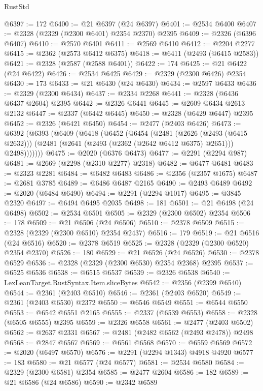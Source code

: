 \begin{lexlean}{RustStd}
\begin{coremodule}
{\begin{coremodule}
{{{{{{{{{{{{{{{{{{{{{{{{{{{{{{{{{{{{{@6397 := 172
@6400 := @21 @6397 (@24 @6397)
@6401 := @2534 @6400
@6407 := @2328 (@2329 (@2300 @6401) @2354 @2370) @2395
@6409 := @2326 (@6396 @6407)
@6410 := @2570 @6401
@6411 := @2569 @6410
@6412 := @2204 @2277
@6415 := @2362 (@2573 @6412 @6375)
@6418 := @6411 (@2493 (@6415 @2583))
@6421 := @2328 (@2587 (@2588 @6401))
@6422 := 174
@6425 := @21 @6422 (@24 @6422)
@6426 := @2534 @6425
@6429 := @2329 (@2300 @6426) @2354
@6430 := 173
@6433 := @21 @6430 (@24 @6430)
@6434 := @2597 @6433
@6436 := @2329 (@2300 @6434)
@6437 := @2334 @2268
@6441 := @2328 (@6436 @6437 @2604) @2395
@6442 := @2326 @6441
@6445 := @2609 @6434 @2613 @2132
@6447 := @2337 (@6442 @6445)
@6450 := @2328 (@6429 @6447) @2395
@6452 := @2326 (@6421 @6450)
@6454 := @2477 (@2403 @6426)
@6473 := @6392
    (@6393
      (@6409
        (@6418
          (@6452
            (@6454
              (@2481
                (@2626 (@2493 (@6415 @2632)))
                (@2481 (@2641 (@2493 (@2362 (@2642 @6412 @6375) @2651))) @2498)))))))
@6475 := @2020 (@6376 @6473)
@6477 := @2291 (@2294 @987)
@6481 := @2669 (@2298 (@2310 @2277) @2318)
@6482 := @6477 @6481
@6483 := @2323 @2281
@6484 := @6482 @6483
@6486 := @2356 (@2357 @1675)
@6487 := @2681 @3785
@6489 := @6486 @6487 @2165
@6490 := @2493 @6489
@6492 := @2020 (@6484 @6490)
@6494 := @2291 (@2294 @1017)
@6495 := @3845 @2320
@6497 := @6494 @6495 @2035
@6498 := 181
@6501 := @21 @6498 (@24 @6498)
@6502 := @2534 @6501
@6505 := @2329 (@2300 @6502) @2354
@6506 := 178
@6509 := @21 @6506 (@24 @6506)
@6510 := @2378 @6509
@6515 := @2328 (@2329 (@2300 @6510) @2354 @2437)
@6516 := 179
@6519 := @21 @6516 (@24 @6516)
@6520 := @2378 @6519
@6525 := @2328 (@2329 (@2300 @6520) @2354 @2370)
@6526 := 180
@6529 := @21 @6526 (@24 @6526)
@6530 := @2378 @6529
@6536 := @2328 (@2329 (@2300 @6530) @2354 @2368) @2395
@6537 := @6525 @6536
@6538 := @6515 @6537
@6539 := @2326 @6538
@6540 := LexLeanTarget.RustSyntax.Item.sliceBytes
@6542 := @2356 (@2399 @6540)
@6544 := @2361 (@2403 @6510)
@6546 := @2361 (@2403 @6520)
@6549 := @2361 (@2403 @6530) @2372
@6550 := @6546 @6549
@6551 := @6544 @6550
@6553 := @6542 @6551 @2165
@6555 := @2337 (@6539 @6553)
@6558 := @2328 (@6505 @6555) @2395
@6559 := @2326 @6558
@6561 := @2477 (@2403 @6502)
@6562 := @2637 @2331
@6567 := @2481 (@2482 @6562 (@2493 @2478)) @2498
@6568 := @2847 @6567
@6569 := @6561 @6568
@6570 := @6559 @6569
@6572 := @2020 (@6497 @6570)
@6576 := @2291 (@2294 @1343) @4918 @4920
@6577 := 183
@6580 := @21 @6577 (@24 @6577)
@6581 := @2534 @6580
@6584 := @2329 (@2300 @6581) @2354
@6585 := @2477 @2604
@6586 := 182
@6589 := @21 @6586 (@24 @6586)
@6590 := @2342 @6589
}}}}}}}}}}}}}}}}}}}}}}}}}}}}}}}}}}}}}
\end{coremodule}}
\end{coremodule}
\end{lexlean}
